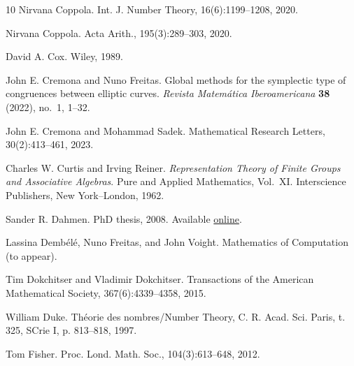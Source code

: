 \documentclass[12pt]{amsart}
\numberwithin{equation}{section}
\theoremstyle{definition}
\begin{document}
\begin{thebibliography}{10}
Nirvana Coppola.
\newblock Int. J. Number Theory, 16(6):1199--1208, 2020.

Nirvana Coppola.
\newblock Acta Arith., 195(3):289--303, 2020.

David A. Cox.
\newblock Wiley, 1989.

John E. Cremona and Nuno Freitas.
\newblock Global methods for the symplectic type of congruences between elliptic curves.
\newblock \emph{Revista Matem\'atica Iberoamericana} \textbf{38} (2022), no.~1, 1--32.

John E. Cremona and Mohammad Sadek.
\newblock Mathematical Research Letters, 30(2):413--461, 2023.

Charles W. Curtis and Irving Reiner.
\newblock \emph{Representation Theory of Finite Groups and Associative
  Algebras}.
\newblock Pure and Applied Mathematics, Vol.~XI. Interscience
  Publishers, New York--London, 1962.

Sander R. Dahmen.
\newblock PhD thesis, 2008. Available \href{https://dspace.library.uu.nl/items/f47be358-d1ff-4c7e-9b14-a930195c182c}{online}.

Lassina Demb\'el\'e, Nuno Freitas, and John Voight.
\newblock Mathematics of Computation (to appear).

Tim Dokchitser and Vladimir Dokchitser.
\newblock Transactions of the American Mathematical Society, 367(6):4339--4358, 2015.

William Duke.
\newblock Th\'eorie des nombres/Number Theory, C. R. Acad. Sci. Paris, t. 325, SCrie I, p. 813–818, 1997.

Tom Fisher.
\newblock Proc. Lond. Math. Soc., 104(3):613--648, 2012.


\end{thebibliography}
\end{document}
